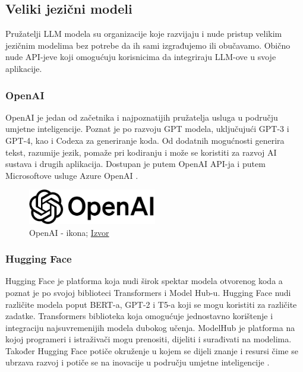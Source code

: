 \documentclass[]{foi}
\begin{document}
\subsection{Veliki jezični modeli}
Pružatelji LLM modela su organizacije koje razvijaju i nude pristup velikim jezičnim modelima bez potrebe da ih sami izgrađujemo ili obučavamo. 
Obično nude API-jeve koji omogućuju korisnicima da integriraju LLM-ove u svoje aplikacije.

\subsubsection{OpenAI}
OpenAI je jedan od začetnika i najpoznatijih pružatelja usluga u području umjetne inteligencije. Poznat je po razvoju GPT modela, uključujući GPT-3 i GPT-4, kao i Codexa za generiranje koda.
Od dodatnih mogućnosti generira tekst, razumije jezik, pomaže pri kodiranju i može se koristiti za razvoj AI sustava i drugih aplikacija. Dostupan je putem OpenAI API-ja i putem Microsoftove usluge
Azure OpenAI \cite{ozkaya2025llm}.

\begin{figure}[h]
  \centering
  \includegraphics[width=0.5\textwidth]{./assets/OpenAI_Logo.png}
  \caption{OpenAI - ikona; \href{https://upload.wikimedia.org/wikipedia/commons/thumb/4/4d/OpenAI_Logo.svg/1280px-OpenAI_Logo.svg.png}{Izvor}}
  \label{fig:slika13}
\end{figure}
\newpage

\subsubsection{Hugging Face}
Hugging Face je platforma koja nudi širok spektar modela otvorenog koda a poznat je po svojoj biblioteci Transformers i Model Hub-u. Hugging Face nudi različite modela poput BERT-a, GPT-2 i T5-a koji se mogu koristiti za različite zadatke.
Transformers biblioteka koja omogućuje jednostavno korištenje i integraciju najsuvremenijih modela dubokog učenja. ModelHub je platforma na kojoj programeri i istraživači mogu prenositi, dijeliti i surađivati na modelima. Također Hugging 
Face potiče okruženje u kojem se dijeli znanje i resursi čime se ubrzava razvoj i potiče se na inovacije u području umjetne inteligencije \cite{ozkaya2025llm}.
\end{document}
